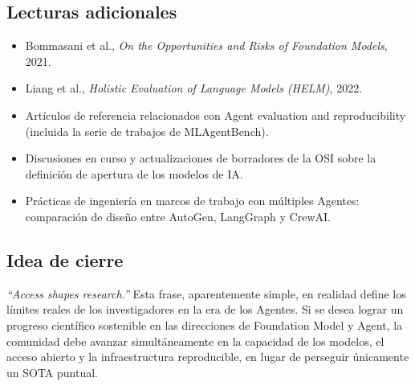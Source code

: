 \documentclass[a4paper]{article}
\begin{document}
\subsection{Lecturas adicionales}
\begin{itemize}
    \item Bommasani et al., \textit{On the Opportunities and Risks of Foundation Models}, 2021.
    \item Liang et al., \textit{Holistic Evaluation of Language Models (HELM)}, 2022.
    \item Artículos de referencia relacionados con Agent evaluation and reproducibility (incluida la serie de trabajos de MLAgentBench).
    \item Discusiones en curso y actualizaciones de borradores de la OSI sobre la definición de apertura de los modelos de IA.
    \item Prácticas de ingeniería en marcos de trabajo con múltiples Agentes: comparación de diseño entre AutoGen, LangGraph y CrewAI.
\end{itemize}

\subsection{Idea de cierre}
\textit{``Access shapes research.''} Esta frase, aparentemente simple, en realidad define los límites reales de los investigadores en la era de los Agentes.  
Si se desea lograr un progreso científico sostenible en las direcciones de Foundation Model y Agent, la comunidad debe avanzar simultáneamente en la capacidad de los modelos, el acceso abierto y la infraestructura reproducible, en lugar de perseguir únicamente un SOTA puntual.

\end{document}
